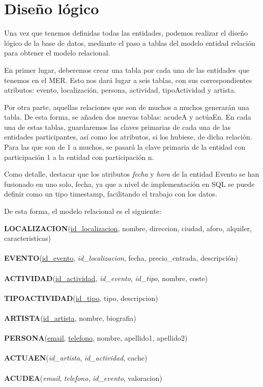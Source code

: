 \documentclass[a4paper,onecolumn]{article}
\let\stdsection\section
\renewcommand\section{\newpage\stdsection}
\begin{document}
\begin{sloppypar}
\section{Diseño lógico} \label{mr}
Una vez que tenemos definidas todas las entidades, podemos realizar el diseño lógico de la base de datos, mediante el paso a tablas del modelo 
entidad relación para obtener el modelo relacional.

En primer lugar, deberemos crear una tabla por cada una de las entidades que tenemos en el MER. Esto nos dará lugar a seis tablas, con sus 
correspondientes atributos: evento, localización, persona, actividad, tipoActividad y artista.

Por otra parte, aquellas relaciones que son de muchos a muchos generarán una tabla. De esta forma, se añaden dos nuevas tablas: acudeA y actúaEn. 
En cada una de estas tablas, guardaremos las claves primarias de cada una de las entidades participantes, así como los atributos, si los hubiese,
de dicha relación. Para las que son de 1 a muchos, se pasará la clave primaria de la entidad con participación 1 a la entidad con participación n.

Como detalle, destacar que los atributos \textit{fecha} y \textit{hora} de la entidad Evento se han fusionado en uno solo, fecha, ya que a nivel 
de implementación en SQL se puede definir como un tipo timestamp, facilitando el trabajo con los datos.

De esta forma, el modelo relacional es el siguiente:

\noindent
\textbf{LOCALIZACION}(\underline{id\_localizacion}, nombre, direccion, ciudad, aforo, alquiler, caracteristicas)\\ \\
\textbf{EVENTO}(\underline{id\_evento}, \textit{id\_localizacion}, fecha, precio\_entrada, descripción)\\ \\
\textbf{ACTIVIDAD}(\underline{id\_actividad}, \textit{id\_evento}, \textit{id\_tipo}, nombre, coste)\\ \\
\textbf{TIPOACTIVIDAD}(\underline{id\_tipo}, tipo, descripcion)\\ \\
\textbf{ARTISTA}(\underline{id\_artista}, nombre, biografia)\\ \\
\textbf{PERSONA}(\underline{email}, \underline{telefono}, nombre, apellido1, apellido2)\\ \\
\textbf{ACTUAEN}(\textit{id\_artista}, \textit{id\_actividad}, cache)\\ \\
\textbf{ACUDEA}(\textit{email}, \textit{telefono}, \textit{id\_evento}, valoracion)\\ \\



\end{sloppypar}
\end{document}
